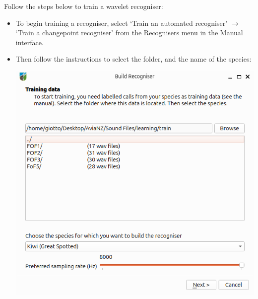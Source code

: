 \documentclass{article}
\begin{document}
Follow the steps below to train a wavelet recogniser:
\begin{itemize}
\item To begin training a recogniser, select `Train an automated recogniser' $\rightarrow$ `Train a changepoint recogniser' from the Recognisers menu in the Manual interface. 
\item Then follow the instructions to select the folder, and the name of the species:
\begin{center}
    \includegraphics[width=.8\textwidth]{Figures/BuildRecogniser1}
\end{center}


\end{itemize}
\end{document}

